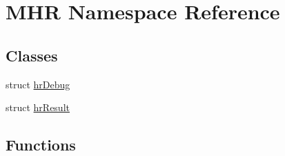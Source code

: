 \hypertarget{namespace_m_h_r}{\section{M\+H\+R Namespace Reference}
\label{namespace_m_h_r}
}
\subsection*{Classes}
\begin{DoxyCompactItemize}
\item 
struct \hyperlink{struct_m_h_r_1_1hr_debug}{hr\+Debug}
\item 
struct \hyperlink{struct_m_h_r_1_1hr_result}{hr\+Result}
\end{DoxyCompactItemize}
\subsection*{Functions}
